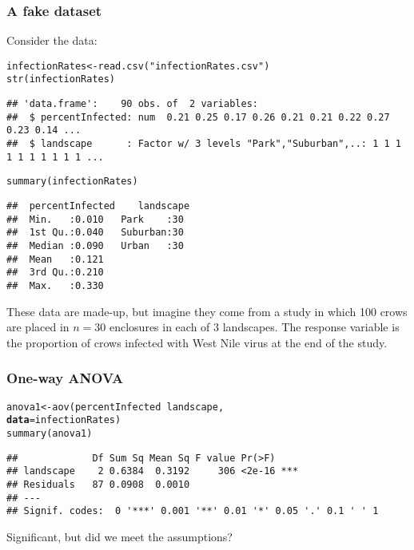 \documentclass[color=usenames,dvipsnames]{beamer}\usepackage[]{graphicx}\usepackage[]{color}
\makeatletter
\newcommand{\hlstr}[1]{\textcolor[rgb]{0.749,0.012,0.012}{#1}}%
\newcommand{\hlopt}[1]{\textcolor[rgb]{0,0,0}{#1}}%
\newcommand{\hlstd}[1]{\textcolor[rgb]{0,0,0}{#1}}%
\newcommand{\hlkwb}[1]{\textcolor[rgb]{0,0.341,0.682}{#1}}%
\newcommand{\hlkwc}[1]{\textcolor[rgb]{0,0,0}{\textbf{#1}}}%
\newcommand{\hlkwd}[1]{\textcolor[rgb]{0.004,0.004,0.506}{#1}}%
\newenvironment{kframe}{%
 \def\at@end@of@kframe{}%
 \ifinner\ifhmode%
  \def\at@end@of@kframe{\end{minipage}}%
  \begin{minipage}{\columnwidth}%
 \fi\fi%
 \def\FrameCommand##1{\hskip\@totalleftmargin \hskip-\fboxsep
 \colorbox{shadecolor}{##1}\hskip-\fboxsep
     \hskip-\linewidth \hskip-\@totalleftmargin \hskip\columnwidth}%
 \MakeFramed {\advance\hsize-\width
   \@totalleftmargin\z@ \linewidth\hsize
   \@setminipage}}%
 {\par\unskip\endMakeFramed%
 \at@end@of@kframe}
\newenvironment{knitrout}{}{} %
\makeatother
\begin{document}
\begin{frame}[fragile]
  \frametitle{A fake dataset}

\small
    Consider the data: %
\begin{knitrout}\tiny
{}\color{fgcolor}\begin{kframe}
\begin{alltt}
\hlstd{infectionRates} \hlkwb{<-} \hlkwd{read.csv}\hlstd{(}\hlstr{"infectionRates.csv"}\hlstd{)}
\hlkwd{str}\hlstd{(infectionRates)}
\end{alltt}
\begin{verbatim}
## 'data.frame':	90 obs. of  2 variables:
##  $ percentInfected: num  0.21 0.25 0.17 0.26 0.21 0.21 0.22 0.27 0.23 0.14 ...
##  $ landscape      : Factor w/ 3 levels "Park","Suburban",..: 1 1 1 1 1 1 1 1 1 1 ...
\end{verbatim}
\begin{alltt}
\hlkwd{summary}\hlstd{(infectionRates)}
\end{alltt}
\begin{verbatim}
##  percentInfected    landscape 
##  Min.   :0.010   Park    :30  
##  1st Qu.:0.040   Suburban:30  
##  Median :0.090   Urban   :30  
##  Mean   :0.121                
##  3rd Qu.:0.210                
##  Max.   :0.330
\end{verbatim}
\end{kframe}
\end{knitrout}
\vfill
These data are made-up, but imagine they come from a study in which
100 crows are placed in $n=30$ enclosures in each of 3 landscapes. The
response variable is the proportion of crows infected with West Nile
virus at the end of the study. \\
\end{frame}







\begin{frame}[fragile]
  \frametitle{One-way ANOVA}
\begin{knitrout}\footnotesize
{}\color{fgcolor}\begin{kframe}
\begin{alltt}
\hlstd{anova1} \hlkwb{<-} \hlkwd{aov}\hlstd{(percentInfected} \hlopt{~} \hlstd{landscape,}
              \hlkwc{data}\hlstd{=infectionRates)}
\hlkwd{summary}\hlstd{(anova1)}
\end{alltt}
\begin{verbatim}
##             Df Sum Sq Mean Sq F value Pr(>F)    
## landscape    2 0.6384  0.3192     306 <2e-16 ***
## Residuals   87 0.0908  0.0010                   
## ---
## Signif. codes:  0 '***' 0.001 '**' 0.01 '*' 0.05 '.' 0.1 ' ' 1
\end{verbatim}
\end{kframe}
\end{knitrout}
\pause
\vfill
Significant, but did we meet the assumptions?
\end{frame}
\end{document}
